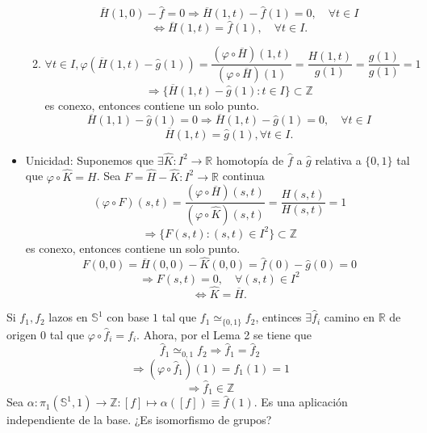 \begin{dem}
\begin{itemize}
\begin{enumerate}[label=(\roman*)]
          \[ 
            \overline{H}(1,0) - \hat{f} = 0 \Rightarrow \overline{H}(1, t) - \hat{ f }(1) = 0, \quad \forall t \in I
          \] 
          \[ 
            \Leftrightarrow \overline{H}(1, t) = \hat{ f }(1), \quad \forall t \in I.
          \] 
        \item
          \[ 
            \forall t \in I, \varphi(\overline{H}(1, t) - \hat{ g }(1)) = \frac{(\varphi \circ \overline{H})(1, t)}{(\varphi \circ \overline{H})(1)} = \frac{H(1,t)}{g(1)} = \frac{g(1)}{g(1)} = 1 
          \] 
          \[ 
            \Rightarrow \{ \overline{H}(1,t) - \hat{ g }(1) : t \in I \} \subset \mathbb{Z}
          \] 
          es conexo, entonces contiene un solo punto.
          \[ 
            \overline{H}(1, 1) - \hat{ g }(1) = 0 \Rightarrow \overline{H}(1,t) - \hat{ g }(1) = 0, \quad \forall t \in I
          \] 
          \[ 
            \overline{H}(1, t) = \hat{ g }(1), \forall t \in I.
          \] 
      \end{enumerate}

    \item Unicidad: Suponemos que $\exists \hat{ K } : I^{2} \to \mathbb{R}$ homotopía de $\hat{ f }$ a $\hat{ g }$ relativa a $\{ 0, 1 \}$ tal que $\varphi \circ \hat{ K } = H$. Sea $F = \hat{ H } - \hat{ K } : I^{2} \to \mathbb{R}$ continua
      \[ 
        (\varphi \circ F)(s,t) = \frac{(\varphi \circ \overline{H})(s,t)}{(\varphi \circ \hat{ K })(s,t)} = \frac{H(s,t)}{H(s,t)} = 1
      \] 
      \[ 
        \Rightarrow \{ F(s,t) : (s,t) \in I^{2} \} \subset \mathbb{Z} 
      \] 
      es conexo, entonces contiene un solo punto.
      \[ 
        F(0,0) = \overline{H}(0,0) - \hat{ K }(0, 0) = \hat{ f }(0) - \hat{ g }(0) = 0
      \] 
      \[ 
        \Rightarrow F(s,t) = 0, \quad \forall (s,t) \in I^{2}   
      \] 
      \[ 
        \Leftrightarrow \hat{ K } = \overline{H}.
      \] 
  \end{itemize}
\end{dem}

\begin{obs}
  Si $f_{1}, f_{2}$ lazos en $\mathbb{S}^{1}$ con base $1$ tal que $f_{1} \simeq_{\{ 0,1 \}}f_{2}$, entinces $\exists \hat{ f }_{i}$ camino en $\mathbb{R}$ de origen $0$ tal que $\varphi \circ \hat{ f }_{i} = f_{i}$. Ahora, por el Lema 2 se tiene que
  \[
    \hat{ f }_{1} \simeq_{0, 1} f_{2} \Rightarrow \hat{ f }_{1} = \hat{ f }_{2}
  \]
  \[ 
    \Rightarrow (\varphi \circ \hat{ f }_{1})(1) = f_{1}(1) = 1 
  \] 
  \[ 
    \Rightarrow \hat{ f }_{1} \in \mathbb{Z}
  \] 
  Sea $\alpha : \pi_{1}(\mathbb{S}^{1}, 1) \to \mathbb{Z}: [ f ] \mapsto \alpha([ f ]) \equiv \hat{ f }(1)$. Es una aplicación independiente de la base. ¿Es isomorfismo de grupos?
\end{obs}

